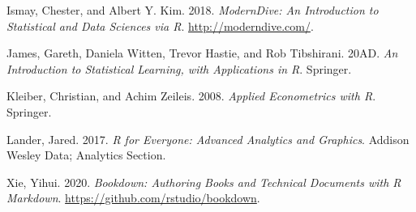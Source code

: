 \documentclass[
]{book}
\begin{document}
\leavevmode\hypertarget{ref-moderndive2018}{}%
Ismay, Chester, and Albert Y. Kim. 2018. \emph{ModernDive: An Introduction to Statistical and Data Sciences via R}. \url{http://moderndive.com/}.

\leavevmode\hypertarget{ref-ISL2017}{}%
James, Gareth, Daniela Witten, Trevor Hastie, and Rob Tibshirani. 20AD. \emph{An Introduction to Statistical Learning, with Applications in R}. Springer.

\leavevmode\hypertarget{ref-AER2008}{}%
Kleiber, Christian, and Achim Zeileis. 2008. \emph{Applied Econometrics with R}. Springer.

\leavevmode\hypertarget{ref-lander2017}{}%
Lander, Jared. 2017. \emph{R for Everyone: Advanced Analytics and Graphics}. Addison Wesley Data; Analytics Section.

\leavevmode\hypertarget{ref-R-bookdown}{}%
Xie, Yihui. 2020. \emph{Bookdown: Authoring Books and Technical Documents with R Markdown}. \url{https://github.com/rstudio/bookdown}.
\end{document}
